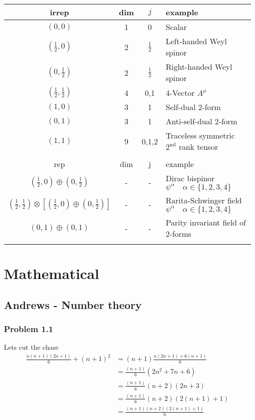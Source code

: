 \documentclass[10pt,a4paper]{article}
\theoremstyle{definition}
\begin{document}
\begin{center}
 \begin{tabular}{c c c l} 
 \hline
 irrep & dim & $j$ & example \\ [0.5ex] 
 \hline\hline
 $(0,0)$                        & 1 & 0 & Scalar \\  [0.5ex]
 $(\frac{1}{2},0)$              & 2 & $\frac{1}{2}$ & Left-handed Weyl spinor \\  [0.5ex]
 $(0,\frac{1}{2})$              & 2 & $\frac{1}{2}$ & Right-handed Weyl spinor \\  [0.5ex]
 $(\frac{1}{2},\frac{1}{2})$    & 4 & 0,1 & 4-Vector $A^\mu$ \\  [0.5ex]
 $(1,0)$                        & 3 & 1 & Self-dual 2-form \\  [0.5ex]
 $(0,1)$                        & 3 & 1 & Anti-self-dual 2-form \\  [0.5ex]
 $(1,1)$                        & 9 & 0,1,2 & Traceless symmetric $2^\text{nd}$ rank tensor \\ \hline  \\ [0.5ex]
  \hline
 rep & dim & j & example \\ [0.5ex] 
 \hline\hline
 $(\frac{1}{2},0)\oplus(0,\frac{1}{2})$& - & - & Dirac bispinor $\psi^\alpha\quad \alpha\in\{1,2,3,4\}$ \\  [0.5ex]
 $(\frac{1}{2},\frac{1}{2})\otimes\left[(\frac{1}{2},0)\oplus(0,\frac{1}{2})\right]$& - & - & Rarita-Schwinger field $\psi^\alpha\quad \alpha\in\{1,2,3,4\}$ \\  [0.5ex]
  $(0,1)\oplus(0,1)$& - & - & Parity invariant field of 2-forms\\ \hline \\ [0.5ex]
\end{tabular}
\end{center}



\newpage
\section{Mathematical}

\subsection{{\sc Andrews} - Number theory}
\subsubsection{Problem 1.1}
Lets cut the chase
\begin{align}
\frac{n(n+1)(2n+1)}{6}+(n+1)^2
&=(n+1)\frac{n(2n+1)+6(n+1)}{6}\\
&=\frac{(n+1)}{6}(2n^2+7n+6)\\
&=\frac{(n+1)}{6}(n+2)(2n+3)\\
&=\frac{(n+1)}{6}(n+2)(2(n+1)+1)\\
&=\frac{(n+1)(n+2)(2(n+1)+1)}{6}\\
\end{align}
\end{document}
